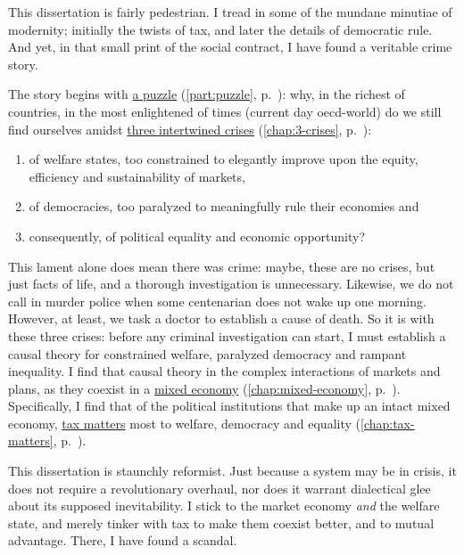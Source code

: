 


This dissertation is fairly pedestrian.
I tread in some of the mundane minutiae of modernity;
initially the twists of tax, and later the details of democratic rule.
And yet, in that small print of the social contract, I have found a veritable crime story.

The story begins with \hyperref[part:puzzle]{a puzzle} (\autoref{part:puzzle}, p.~\pageref{part:puzzle}):
why, in the richest of countries, in the most enlightened of times (current day \gls{oecd}-world) do we still find ourselves amidst \hyperref[chap:3-crises]{three intertwined crises} (\autoref{chap:3-crises}, p.~\pageref{chap:3-crises}):

\begin{enumerate}
	\item of welfare states, too constrained to elegantly improve upon the equity, efficiency and sustainability of markets,
	\item of democracies, too paralyzed to meaningfully rule their economies and
	\item consequently, of political equality and economic opportunity?
\end{enumerate}

This lament alone does mean there was crime:
maybe, these are no crises, but just facts of life, and a thorough investigation is unnecessary.
Likewise, we do not call in murder police when some centenarian does not wake up one morning.
However, at least, we task a doctor to establish a cause of death.
So it is with these three crises:
before any criminal investigation can start, I must establish a causal theory for constrained welfare, paralyzed democracy and rampant inequality.
I find that causal theory in the complex interactions of markets and plans, as they coexist in a \hyperref[chap:mixed-economy]{mixed economy} (\autoref{chap:mixed-economy}, p.~\pageref{chap:mixed-economy}).
Specifically, I find that of the political institutions that make up an intact mixed economy, \hyperref[chap:tax-matters]{tax matters} most to welfare, democracy and equality (\autoref{chap:tax-matters}, p.~\pageref{chap:tax-matters}).

This dissertation is staunchly reformist.
Just because a system may be in crisis, it does not require a revolutionary overhaul, nor does it warrant dialectical glee about its supposed inevitability.
I stick to the market economy \emph{and} the welfare state, and merely tinker with tax to make them coexist better, and to mutual advantage.
There, I have found a scandal.

